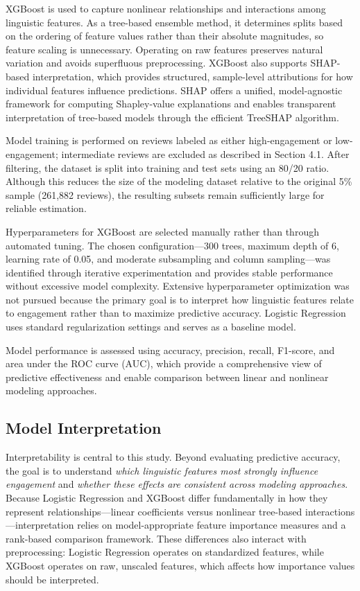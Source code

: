 \documentclass[12pt]{article}
\begin{document}
XGBoost is used to capture nonlinear relationships and interactions among linguistic features. As a tree-based ensemble method, it determines splits based on the ordering of feature values rather than their absolute magnitudes, so feature scaling is unnecessary. Operating on raw features preserves natural variation and avoids superfluous preprocessing. XGBoost also supports SHAP-based interpretation, which provides structured, sample-level attributions for how individual features influence predictions. 
SHAP offers a unified, model-agnostic framework for computing Shapley-value explanations and enables transparent interpretation of tree-based models through the efficient TreeSHAP algorithm.

Model training is performed on reviews labeled as either high-engagement or low-engagement; intermediate reviews are excluded as described in Section 4.1. After filtering, the dataset is split into training and test sets using an 80/20 ratio. Although this reduces the size of the modeling dataset relative to the original 5\% sample (261,882 reviews), the resulting subsets remain sufficiently large for reliable estimation.

Hyperparameters for XGBoost are selected manually rather than through automated tuning. The chosen configuration—300 trees, maximum depth of 6, learning rate of 0.05, and moderate subsampling and column sampling—was identified through iterative experimentation and provides stable performance without excessive model complexity. Extensive hyperparameter optimization was not pursued because the primary goal is to interpret how linguistic features relate to engagement rather than to maximize predictive accuracy. Logistic Regression uses standard regularization settings and serves as a baseline model.

Model performance is assessed using accuracy, precision, recall, F1-score, and area under the ROC curve (AUC), which provide a comprehensive view of predictive effectiveness and enable comparison between linear and nonlinear modeling approaches.

\subsection{Model Interpretation}

Interpretability is central to this study. Beyond evaluating predictive accuracy, the goal is to understand \emph{which linguistic features most strongly influence engagement} and \emph{whether these effects are consistent across modeling approaches}. Because Logistic Regression and XGBoost differ fundamentally in how they represent relationships—linear coefficients versus nonlinear tree-based interactions—interpretation relies on model-appropriate feature importance measures and a rank-based comparison framework. These differences also interact with preprocessing: Logistic Regression operates on standardized features, while XGBoost operates on raw, unscaled features, which affects how importance values should be interpreted.
\end{document}
